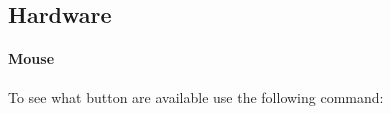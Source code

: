 \subsection{Hardware}

\paragraph{Mouse}
To see what button are available use the following command:
